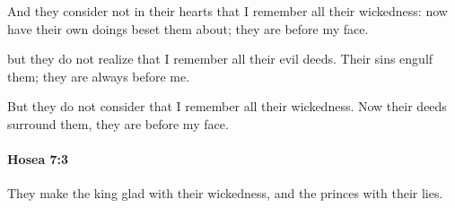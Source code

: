 			\begin{versebox}
					\item[BHS] 
					\item[LXX] 
					\item[ASV] And they consider not in their hearts that I remember all their wickedness: now have their own doings beset them about; they are before my face.
					\item[NIV] but they do not realize that I remember all their evil deeds. Their sins engulf them; they are always before me.
					\item[NRSV] But they do not consider that I remember all their wickedness. Now their deeds surround them, they are before my face.
			\end{versebox}

		\paragraph{Hosea 7:3} %
			\label{HOSEA-7-3}

			They make the king glad with their wickedness, and the princes with their lies.

